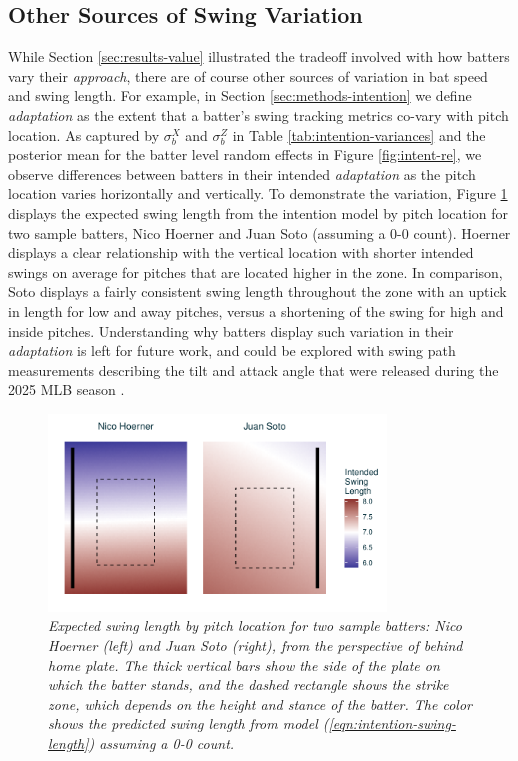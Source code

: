 \documentclass{article}
\begin{document}
    \subsection{Other Sources of Swing Variation}
    \label{sec:results-other}

    While Section \ref{sec:results-value} illustrated the tradeoff involved with how batters vary their \textit{approach}, there are of course other sources of variation in bat speed and swing length. For example, in Section \ref{sec:methods-intention} we define \textit{adaptation} as the extent that a batter's swing tracking metrics co-vary with pitch location. As captured by $\sigma_b^X$ and $\sigma_b^Z$ in Table \ref{tab:intention-variances} and the posterior mean for the batter level random effects in Figure \ref{fig:intent-re}, we observe differences between batters in their intended \textit{adaptation} as the pitch location varies horizontally and vertically. To demonstrate the variation, Figure \ref{fig:adaptation} displays the expected swing length from the intention model by pitch location for two sample batters, Nico Hoerner and Juan Soto (assuming a 0-0 count). Hoerner displays a clear relationship with the vertical location with shorter intended swings on average for pitches that are located higher in the zone. In comparison, Soto displays a fairly consistent swing length throughout the zone with an uptick in length for low and away pitches, versus a shortening of the swing for high and inside pitches. Understanding why batters display such variation in their \textit{adaptation} is left for future work, and could be explored with swing path measurements describing the tilt and attack angle that were released during the 2025 MLB season \citep{petriello_4_2025}.    
    
      \begin{figure}[H]
        \centering
        \includegraphics[width = 0.8\textwidth]{../../figures/adaptation.pdf}
        \caption{\it Expected swing length by pitch location for two sample batters: Nico Hoerner (left) and Juan Soto (right), from the perspective of behind home plate. The thick vertical bars show the side of the plate on which the batter stands, and the dashed rectangle shows the strike zone, which depends on the height and stance of the batter. The color shows the predicted swing length  from model (\ref{eqn:intention-swing-length}) assuming a 0-0 count.}
        \label{fig:adaptation}
      \end{figure}
\end{document}
